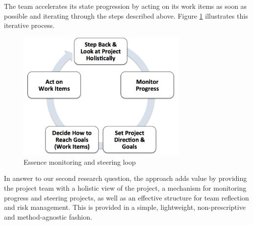 The team accelerates its state progression by acting on its work items as soon as possible and iterating through the steps described above. Figure \ref{EssenceMonitoringLoop} illustrates this iterative process.

\begin{figure}[t]
\centering
\includegraphics[width=3.30in]{project_steering_images/EssenceMonitoringLoop.png}
\caption{Essence monitoring and steering loop}
\label{EssenceMonitoringLoop}
\end{figure}

In answer to our second research question, the approach adds value by providing the project team with a holistic view of the project, a mechanism for monitoring progress and steering projects, as well as an effective structure for team reflection and risk management. This is provided in a simple, lightweight, non-prescriptive and method-agnostic fashion.

